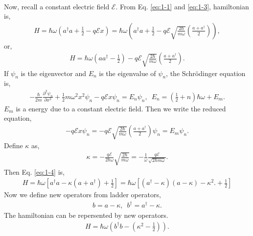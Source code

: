 \documentclass[floatfix,nofootinbib,superscriptaddress,fleqn]{revtex4-2}
\begin{document}
\begin{itemize}
\begin{align}
  \end{align}
  Now, recall a constant electric field $\mathcal{E}$. From Eq. \eqref{eq:1-1}
   and \eqref{eq:1-3}, hamiltonian is,
   \begin{align}
    H = \hbar\omega\left(a^\dagger a + \frac{1}{2}-q\mathcal{E}x\right)
    = \hbar\omega\left(a^\dagger a + \frac{1}{2}-q\mathcal{E}
    \sqrt{\frac{2\hbar}{m\omega}}\left(\frac{a+a^\dagger}{2}\right)\right),
   \end{align}  
   or,
   \begin{align}\label{eq:1-4}
    H = \hbar\omega\left(a a^\dagger - \frac{1}{2}\right)
    -q\mathcal{E}\sqrt{\frac{2\hbar}{m\omega}}
    \left(\frac{a+a^\dagger}{2}\right).
   \end{align}
   If $\psi_n$ is the eigenvector and $E_n$ is the eigenvalue of $\psi_n$, 
   the Schr\"odinger equation is,
   \begin{align}
    -\frac{\hbar}{2m}\frac{\partial^2\psi_n}{\partial x^2}
    +\frac{1}{2}m\omega^2x^2\psi_n
    -q\mathcal{E}x\psi_n = E_n\psi_n,\,\,\, 
    E_n = \left(\frac{1}{2}+n\right)\hbar\omega+E_m.
   \end{align}
   $E_m$ is a energy due to a constant electric field. Then we write the 
   reduced equation,
   \begin{align}\label{eq:1-5}
    -q\mathcal{E}x\psi_n = -q\mathcal{E}\sqrt{\frac{2\hbar}{m\omega}}
    \left(\frac{a+a^\dagger}{2}\right)\psi_n = E_m\psi_n.
   \end{align}
   Define $\kappa$ as,
   \begin{align}
     \kappa = -\frac{q\mathcal{E}}{2\hbar\omega}\sqrt{\frac{2\hbar}{m\omega}}
     = -\frac{1}{\omega}\frac{q\mathcal{E}}{\sqrt{2\hbar m\omega}}.
   \end{align}
   Then Eq. \eqref{eq:1-4} is,
   \begin{align}
     H = \hbar\omega\left[a^\dagger a-\kappa\left(a+a^\dagger\right)
     +\frac{1}{2}\right]
     = \hbar\omega\left[(a^\dagger - \kappa)(a - \kappa) -\kappa^2.
     +\frac{1}{2}\right]
   \end{align}
   Now we define new operators from ladder operators,
   \begin{align}
     b = a - \kappa,\,\,\,
     b^\dagger = a^\dagger - \kappa.
   \end{align}
   The hamiltonian can be repersented by new operators.
   \begin{align}
     H = \hbar\omega\left( b^\dagger b -\left(\kappa^2-\frac{1}{2}\right)\right).
   \end{align}

\end{itemize}
\end{document}
